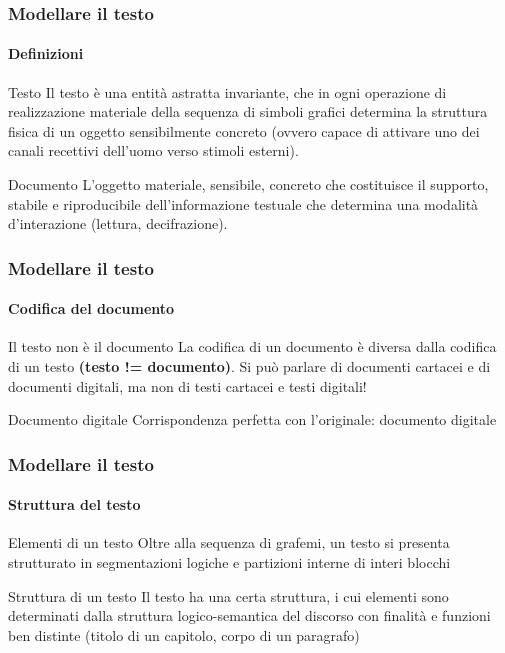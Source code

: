 \begin{frame}
	\frametitle{Modellare il testo}
	\framesubtitle{Definizioni}
	\addtocounter{nframe}{1}

	\begin{block}{Testo}
		Il testo è una entità astratta invariante, che in ogni operazione di realizzazione materiale della sequenza di simboli grafici determina la struttura fisica di un oggetto sensibilmente concreto (ovvero capace di attivare uno dei canali recettivi dell’uomo verso stimoli esterni).
	\end{block}

	\begin{block}{Documento}
		L'oggetto materiale, sensibile, concreto che costituisce il supporto, stabile e riproducibile dell’informazione testuale che determina una modalità d’interazione (lettura, decifrazione).
	\end{block}

\end{frame}

\begin{frame}
	\frametitle{Modellare il testo}
	\framesubtitle{Codifica del documento}
	\addtocounter{nframe}{1}

	\begin{block}{Il testo non è il documento}
		La codifica di un documento è diversa dalla codifica di un
		testo \textbf{(testo != documento)}. Si può parlare di documenti cartacei e di documenti
		digitali, ma non di testi cartacei e testi digitali!
	\end{block}

	\begin{block}{Documento digitale}
		Corrispondenza perfetta con l'originale: documento digitale
	\end{block}


\end{frame}

\begin{frame}
	\frametitle{Modellare il testo}
	\framesubtitle{Struttura del testo}
	\addtocounter{nframe}{1}

	\begin{block}{Elementi di un testo}
		Oltre alla sequenza di grafemi, un testo si presenta strutturato in segmentazioni logiche e partizioni interne di interi blocchi
	\end{block}

	\begin{block}{Struttura di un testo}
		Il testo ha una certa struttura, i cui elementi sono determinati dalla struttura logico-semantica del discorso con finalità e funzioni ben distinte (titolo di un capitolo, corpo di un paragrafo)
	\end{block}

\end{frame}


